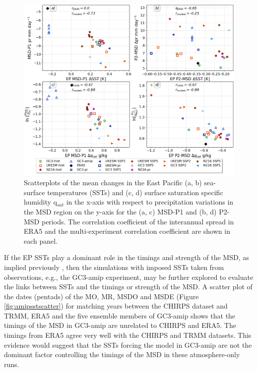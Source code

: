 \begin{figure}[t!]
\includegraphics[width=\linewidth]{figures/sst_scatter_f.png}
\caption[Scatter plot of SST changes]{Scatterplots of the mean changes in the East Pacific (a, b) sea-surface temperatures (SSTs) and (c, d) surface saturation specific humidity q$_{sat}$ in the x-axis with respect to precipitation variations in the MSD region on the y-axis for the (a, c) MSD-P1 and (b, d) P2-MSD periods.  The correlation coefficient of the interannual spread in ERA5 and the multi-experiment correlation coefficient are shown in each panel.   }
\label{fig:var_sst_lhf_scatter}
\end{figure}


If the EP SSTs play a dominant role in the timings and strength of the MSD, as implied previously \citep{magana1999,magana2005,herrera2015}, then the simulations with imposed SSTs taken from observations, e.g., the GC3-amip experiment, may be further explored to evaluate the links  between SSTs and the timings or strength of the MSD. A scatter plot of the dates (pentads) of the MO, MR, MSDO and MSDE (Figure \ref{fig:amipsstscatter}) for matching years between the CHIRPS dataset and TRMM, ERA5 and the five ensemble members of GC3-amip shows that the timings of the MSD in GC3-amip are unrelated to CHIRPS and ERA5. The timings from ERA5 agree very well with the CHIRPS and TRMM datasets. 
This evidence would suggest that the SSTs forcing the model in GC3-amip are not the dominant factor controlling the timings of the MSD in these atmosphere-only runs.

